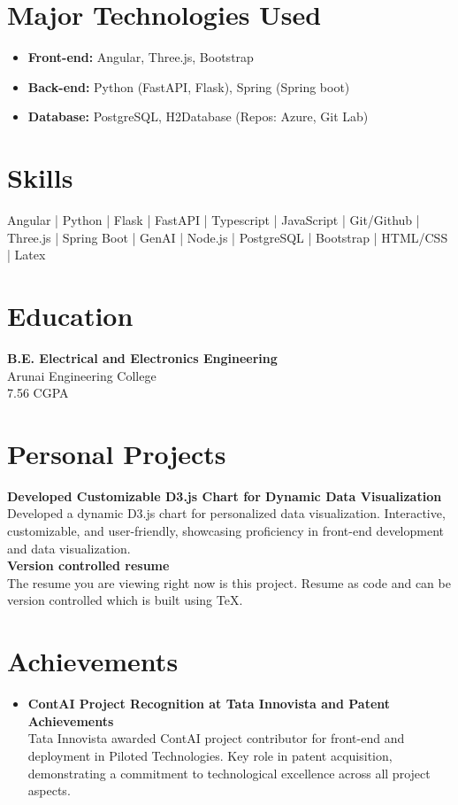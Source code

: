 \documentclass[letterpaper,10pt]{article}
\begin{document}
\begin{multicols}{2}
\section*{\textcolor{headercolor}{Major Technologies Used}}
\begin{itemize}
    \item \textbf{Front-end:} Angular, Three.js, Bootstrap
    \item \textbf{Back-end:} Python (FastAPI, Flask), Spring (Spring boot)
    \item \textbf{Database:} PostgreSQL, H2Database (Repos: Azure, Git Lab)
\end{itemize}

\section*{\textcolor{headercolor}{Skills}}
Angular | Python | Flask | FastAPI | Typescript | JavaScript | Git/Github | Three.js | Spring Boot | GenAI | Node.js | PostgreSQL | Bootstrap | HTML/CSS | Latex

\section*{\textcolor{headercolor}{Education}}
\textbf{B.E. Electrical and Electronics Engineering} \\
Arunai Engineering College \\
7.56 CGPA

\section*{\textcolor{headercolor}{Personal Projects}}
\textbf{Developed Customizable D3.js Chart for Dynamic Data Visualization} \\
Developed a dynamic D3.js chart for personalized data visualization. Interactive, customizable, and user-friendly, showcasing proficiency in front-end development and data visualization.\\
\textbf{Version controlled resume} \\
The resume you are viewing right now is this project. Resume as code and can be version controlled which is built using TeX.

\section*{\textcolor{headercolor}{Achievements}}
\begin{itemize}
    \item \textbf{ContAI Project Recognition at Tata Innovista and Patent Achievements} \\
    Tata Innovista awarded ContAI project contributor for front-end and deployment in Piloted Technologies. Key role in patent acquisition, demonstrating a commitment to technological excellence across all project aspects.
    

\end{itemize}
\end{multicols}
\end{document}
